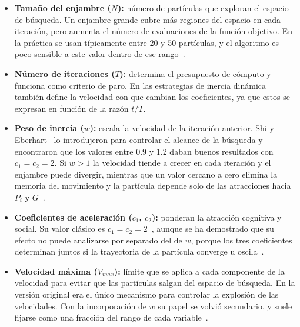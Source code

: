 \begin{itemize}
    \item \textbf{Tamaño del enjambre ($N$):} número de partículas que exploran el espacio de búsqueda. Un enjambre grande cubre más regiones del espacio en cada iteración, pero aumenta el número de evaluaciones de la función objetivo. En la práctica se usan típicamente entre 20 y 50 partículas, y el algoritmo es poco sensible a este valor dentro de ese rango~\cite{poli2007overview, shi1999empirical}.

    \item \textbf{Número de iteraciones ($T$):} determina el presupuesto de cómputo y funciona como criterio de paro. En las estrategias de inercia dinámica también define la velocidad con que cambian los coeficientes, ya que estos se expresan en función de la razón $t/T$.

    \item \textbf{Peso de inercia ($w$):} escala la velocidad de la iteración anterior. Shi y Eberhart~\cite{shi1998modified} lo introdujeron para controlar el alcance de la búsqueda y encontraron que los valores entre 0.9 y 1.2 daban buenos resultados con $c_1 = c_2 = 2$. Si $w > 1$ la velocidad tiende a crecer en cada iteración y el enjambre puede divergir, mientras que un valor cercano a cero elimina la memoria del movimiento y la partícula depende solo de las atracciones hacia $P_i$ y $G$~\cite{shi1998parameter}.

    \item \textbf{Coeficientes de aceleración ($c_1$, $c_2$):} ponderan la atracción cognitiva y social. Su valor clásico es $c_1 = c_2 = 2$~\cite{kennedy1995pso}, aunque se ha demostrado que su efecto no puede analizarse por separado del de $w$, porque los tres coeficientes determinan juntos si la trayectoria de la partícula converge u oscila~\cite{clerc2002particle}.

    \item \textbf{Velocidad máxima ($V_{max}$):} límite que se aplica a cada componente de la velocidad para evitar que las partículas salgan del espacio de búsqueda. En la versión original era el único mecanismo para controlar la explosión de las velocidades. Con la incorporación de $w$ su papel se volvió secundario, y suele fijarse como una fracción del rango de cada variable~\cite{eberhart2000comparing}.
\end{itemize}

